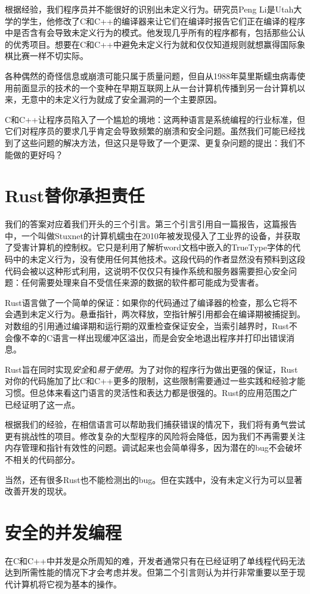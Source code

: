 根据经验，我们程序员并不能很好的识别出未定义行为。研究员Peng Li是Utah大学的学生，他修改了C和C++的编译器来让它们在编译时报告它们正在编译的程序中是否含有会导致未定义行为的模式。他发现几乎所有的程序都有，包括那些公认的优秀项目。想要在C和C++中避免未定义行为就和仅仅知道规则就想赢得国际象棋比赛一样不切实际。

各种偶然的奇怪信息或崩溃可能只属于质量问题，但自从1988年莫里斯蠕虫病毒使用前面显示的技术的一个变种在早期互联网上从一台计算机传播到另一台计算机以来，无意中的未定义行为就成了安全漏洞的一个主要原因。

C和C++让程序员陷入了一个尴尬的境地：这两种语言是系统编程的行业标准，但它们对程序员的要求几乎肯定会导致频繁的崩溃和安全问题。虽然我们可能已经找到了这些问题的解决方法，但这只是导致了一个更深、更复杂问题的提出：我们不能做的更好吗？

\section{Rust替你承担责任}
我们的答案对应着我们开头的三个引言。第三个引言引用自一篇报告，这篇报告中，一个叫做Stuxnet的计算机蠕虫在2010年被发现侵入了工业界的设备，并获取了受害计算机的控制权。它只是利用了解析word文档中嵌入的TrueType字体的代码中的未定义行为，没有使用任何其他技术。这段代码的作者显然没有预料到这段代码会被以这种形式利用，这说明不仅仅只有操作系统和服务器需要担心安全问题：任何需要处理来自不受信任来源的数据的软件都可能成为受害者。

Rust语言做了一个简单的保证：如果你的代码通过了编译器的检查，那么它将不会遇到未定义行为。悬垂指针，两次释放，空指针解引用都会在编译期被捕捉到。对数组的引用通过编译期和运行期的双重检查保证安全，当索引越界时，Rust不会像不幸的C语言一样出现缓冲区溢出，而是会安全地退出程序并打印出错误消息。

Rust旨在同时实现\emph{安全}和\emph{易于使用}。为了对你的程序行为做出更强的保证，Rust对你的代码施加了比C和C++更多的限制，这些限制需要通过一些实践和经验才能习惯。但总体来看这门语言的灵活性和表达力都是很强的。Rust的应用范围之广已经证明了这一点。

根据我们的经验，在相信语言可以帮助我们捕获错误的情况下，我们将有勇气尝试更有挑战性的项目。修改复杂的大型程序的风险将会降低，因为我们不再需要关注内存管理和指针有效性的问题。调试起来也会简单得多，因为潜在的bug不会破坏不相关的代码部分。

当然，还有很多Rust也不能检测出的bug。但在实践中，没有未定义行为可以显著改善开发的现状。

\section{安全的并发编程}
在C和C++中并发是众所周知的难，开发者通常只有在已经证明了单线程代码无法达到所需性能的情况下才会考虑并发。但第二个引言则认为并行非常重要以至于现代计算机将它视为基本的操作。

